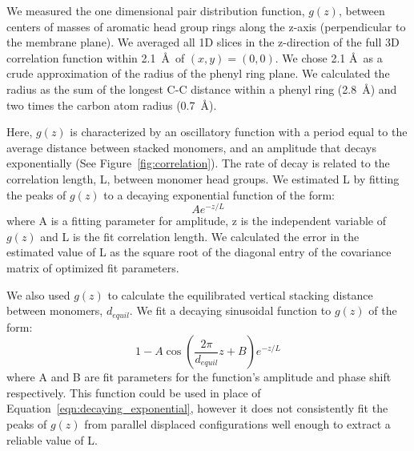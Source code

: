 \documentclass[journal=jpcbfk,manuscript=article]{achemso}
\begin{document}
  We measured the one dimensional pair distribution function, $g(z)$, between centers 
  of masses of aromatic head group rings along the z-axis (perpendicular to
  the membrane plane). We averaged all 1D slices in the z-direction of the full 3D 
  correlation function within 2.1~\AA~of $(x, y)=(0, 0)$. We chose 2.1 \AA~as a crude 
  approximation of the radius of the phenyl ring plane. 
  We calculated the radius as the sum of the longest C-C distance within a phenyl 
  ring (2.8~\AA) and two times the carbon atom radius (0.7~\AA).
  
  Here, $g(z)$ is characterized by an oscillatory function with a period equal to the
  average distance between stacked monomers, and an amplitude that decays exponentially
  (See Figure~\ref{fig:correlation}). The rate of decay is related to the correlation 
  length, L, between monomer head groups. We estimated L by fitting the peaks of $g(z)$
  to a decaying exponential function of the form:
  \begin{equation}
  	Ae^{-z/L}
  	\label{eqn:decaying_exponential}
  \end{equation}
  where A is a fitting parameter for amplitude, z is the independent variable of $g(z)$ 
  and L is the fit correlation length. We calculated the error in the estimated value
  of L as the square root of the diagonal entry of the covariance matrix of 
  optimized fit parameters.
  
  We also used $g(z)$ to calculate the equilibrated vertical stacking distance between
  monomers, $d_{equil}$. 
  We fit a decaying sinusoidal function to $g(z)$ of the form:
  \begin{equation}
  	1 - A\cos\left(\frac{2\pi}{\mathit{d}_{equil}}z + B\right)e^{-z/L}
  	\label{eqn:decaying_sinusoid}
  \end{equation}
  where A and B are fit parameters for the function's amplitude and phase shift respectively.
  This function could be used in place of Equation~\ref{eqn:decaying_exponential}, however
  it does not consistently fit the peaks of $g(z)$ from parallel displaced configurations 
  well enough to extract a reliable value of L.
\end{document}
